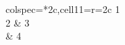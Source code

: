 \documentclass{standalone}
\begin{document}
\begin{tblr}{colspec={*{2}{c}},cell{1}{1}={r=2}{c}}
            {1   \\2} & 3 \\
                                                    & 4        \\
\end{tblr}
\end{document}
